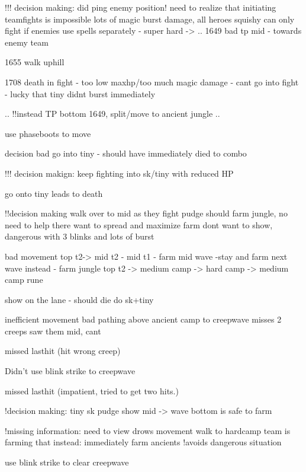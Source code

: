 \documentclass{article}
\newcommand{\mechanics}{\ensuremath{\;\;\color{mechanicscolor} \filledmedsquare} }
\newcommand{\efficiency}{\ensuremath{\;\;\color{efficiencycolor} \filledmedsquare} }
\newcommand{\itemisation}{\ensuremath{\;\;\color{itemisationcolor} \filledmedsquare} }
\newcommand{\decision}{\ensuremath{\;\;\color{decisioncolor} \filledmedsquare} }
\newenvironment{remarks}
    {
        \begin{description}
            \setlength\itemsep{0em}
    }
    {
        \end{description}
    }
\newcommand{\logremark}[3]{\item[\textnormal{\logref{#1}} #2 ] #3}
\newcommand{\logref}[1]{\textcolor{highlight}{#1}}
\begin{document}
\begin{remarks}
\logremark{}{\itemisation}{!!! decision making:
    did ping enemy position!
    need to realize that initiating teamfights is impossible
    lots of magic burst damage, all heroes squishy
    can only fight if enemies use spells separately - super hard
->
..
1649 bad tp mid
    - towards enemy team

1655 walk uphill

1708 death in fight
    - too low maxhp/too much magic damage
    - cant go into fight
    - lucky that tiny didnt burst immediately

 ..
   !!instead TP bottom 1649, split/move to ancient jungle
..
}

\logremark{19:45}{\efficiency}{use phaseboots to move}
          
    
   
\logremark{20:09}{\decision}{decision bad go into tiny - should have immediately died to combo}


\logremark{}{\itemisation}{!!! decision makign:
    keep fighting into sk/tiny  with reduced HP}

\logremark{20:53}{\itemisation}{go onto tiny
    leads to death}

\logremark{}{\decision}{!!decision making
    walk over to mid as they fight pudge
    should farm jungle, no need to help there
    want to spread and maximize farm
    dont want to show, dangerous with 3 blinks and lots of burst

bad movement
top t2-> mid t2 - mid t1 - farm mid wave  -stay and farm next wave
instead - farm jungle
top t2 -> medium camp -> hard camp -> medium camp rune}

\logremark{22:21}{\decision}{show on the lane - should die do sk+tiny }

\logremark{24:45}{\itemisation}{inefficient movement
    bad pathing above ancient camp to creepwave
    misses 2 creeps
    saw them mid, cant }

\logremark{24:57}{\mechanics}{missed lasthit (hit wrong creep)}

\logremark{24:52}{\efficiency}{Didn't use blink strike to creepwave}

\logremark{25:02}{\mechanics}{missed lasthit (impatient, tried to get two hits.)}

\logremark{25:03}{\decision}{!decision making:
    tiny sk pudge show mid
    -> wave bottom is safe to farm}

\logremark{25:04}{\efficiency}{
    !missing information: need to view drows movement
    walk to hardcamp
    team is farming that
    instead: immediately farm ancients
        !avoids dangerous situation
}
\logremark{27:44}{\efficiency}{use blink strike to clear creepwave}


\end{remarks}
\end{document}
